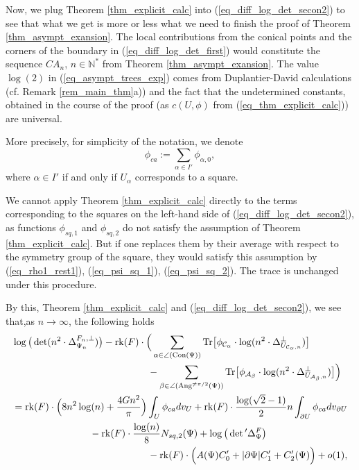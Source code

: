 \documentclass[12pt]{article}
\numberwithin{equation}{section}
\theoremstyle{theorem}
\theoremstyle{definition}
\theoremstyle{remark}
\newcommand{\nat}{\mathbb{N}}
\newcommand{\laplcomp}{\Delta}
\newcommand{\rk}[1]{{\rm{rk}} ( #1 )}
\newcommand{\tr}[1]{{\rm{Tr}} \big[ #1 \big]}
\begin{document}
	Now, we plug Theorem \ref{thm_explicit_calc} into (\ref{eq_diff_log_det_secon2}) to see that what we get is more or less what we need to finish the proof of Theorem \ref{thm_asympt_exansion}.
	The local contributions from the conical points and the corners of the boundary in (\ref{eq_diff_log_det_first}) would constitute the sequence $CA_n$, $n \in \nat^*$ from Theorem \ref{thm_asympt_exansion}.
	The value $\log(2)$ in (\ref{eq_asympt_trees_exp}) comes from Duplantier-David calculations (cf. Remark \ref{rem_main_thm}a)) and  the fact that the undetermined constants, obtained in the course of the proof (as $c(U, \phi)$ from (\ref{eq_thm_explicit_calc})) are universal. 
	\par 
	More precisely, for simplicity of the notation, we denote 
	\begin{equation}
		\phi_{ca} :=  \sum_{\alpha \in I'} \phi_{\alpha, 0},
	\end{equation}
	where $\alpha \in I'$ if and only if $U_{\alpha}$ corresponds to a square.
	\par 
	We cannot apply Theorem \ref{thm_explicit_calc} directly to the terms corresponding to the squares on the left-hand side of (\ref{eq_diff_log_det_secon2}), as functions $\phi_{sq, 1}$ and $\phi_{sq, 2}$ do not satisfy the assumption of Theorem \ref{thm_explicit_calc}. But if one replaces them by their average with respect to the symmetry group of the square, they would satisfy this assumption by (\ref{eq_rho1_rest1}), (\ref{eq_psi_sq_1}), (\ref{eq_psi_sq_2}). The trace is unchanged under this procedure.
	\par 
	By this, Theorem \ref{thm_explicit_calc} and (\ref{eq_diff_log_det_secon2}), we see that,as $n \to \infty$, the following holds
	\begin{equation}\label{eq_log_n2_det_asympt}
	\begin{aligned}
		&
		\log \big(\det(n^2 \cdot\laplcomp_{\Psi_n}^{F_n, \perp})\big)
		-
		\rk{F} \cdot 
		\Big(
		\sum_{\alpha \in \angle({\rm{Con}}(\Psi))}
		\tr{\phi_{\mathcal{C}_{\alpha}} \cdot \log (n^2 \cdot \laplcomp_{U_{\mathcal{C}_{\alpha}, n}}^{\perp})  }
		\\
		&
		\qquad \qquad \qquad \qquad \qquad \qquad  \qquad
		-
		\sum_{\beta \in \angle({\rm{Ang}}^{\neq \pi/2}(\Psi))}
		\tr{\phi_{\mathcal{A}_{\beta}} \cdot \log (n^2 \cdot \laplcomp_{U_{\mathcal{A}_{\beta}, n}}^{\perp})  }
		\Big)
		\\
		&
		=
		\rk{F} \cdot
		\Big(
			8 n^2 \log(n)
			+
			\frac{4Gn^2}{\pi}
		\Big) \int_{U} \phi_{ca} dv_{U}
		+ 
		\rk{F} \cdot \frac{\log(\sqrt{2} - 1)}{2}  n  \int_{\partial U} \phi_{ca} dv_{\partial U}
		\\
		&
		\qquad \qquad \qquad \qquad 
		-
		\rk{F} \cdot
		\frac{\log(n)}{8} N_{sq, 2}(\Psi)
		+
		\log \big( \det{}'\laplcomp_{\Psi}^{F} \big)
		\\
		&
		\qquad \qquad \qquad \qquad \qquad \qquad \qquad 
		-
		\rk{F}
		\cdot
		\Big(
		A(\Psi) C_0' 
		+
		|\partial \Psi| C_1' 
		+
		C_2'(\Psi)
		\Big)
		+ 
		o(1),
	\end{aligned}
	\end{equation}
\end{document}

